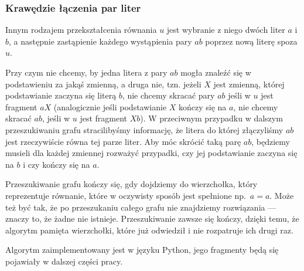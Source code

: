 \documentclass[leqno, 12pt]{article}
\begin{document}
\subsubsection*{Krawędzie łączenia par liter}
Innym rodzajem przekształcenia równania $u$ jest wybranie z niego dwóch liter $a$ i $b$, a następnie zastąpienie każdego wystąpienia pary $ab$ poprzez nową literę spoza $u$.


Przy czym nie chcemy, by jedna litera z pary $ab$ mogła znaleźć się w podstawieniu za jakąś zmienną, a druga nie, tzn. jeżeli $X$ jest zmienną, której podstawianie zaczyna się literą $b$, nie chcemy skracać pary $ab$ jeśli w $u$ jest fragment $aX$ (analogicznie jeśli podstawianie $X$ kończy się na $a$, nie chcemy skracać $ab$, jeśli w $u$ jest fragment $Xb$). W przeciwnym przypadku w dalszym przeszukiwaniu grafu stracilibyśmy informację, że litera do której złączyliśmy $ab$ jest rzeczywiście równa tej parze liter. Aby móc skrócić taką parę $ab$, będziemy musieli dla każdej zmiennej rozważyć przypadki, czy jej podstawianie zaczyna się na $b$ i czy kończy się na $a$.


Przeszukiwanie grafu kończy się, gdy dojdziemy do wierzchołka, który reprezentuje równanie, które w oczywisty sposób jest spełnione np.\ $a=a$. Może też być tak, że po przeszukaniu całego grafu nie znajdziemy rozwiązania --- znaczy to, że żadne nie istnieje. Przeszukiwanie zawsze się kończy, dzięki temu, że algorytm pamięta wierzchołki, które już odwiedził i nie rozpatruje ich drugi raz.



Algorytm zaimplementowany jest w języku Python, jego fragmenty będą się pojawiały w dalszej części pracy.
\end{document}
